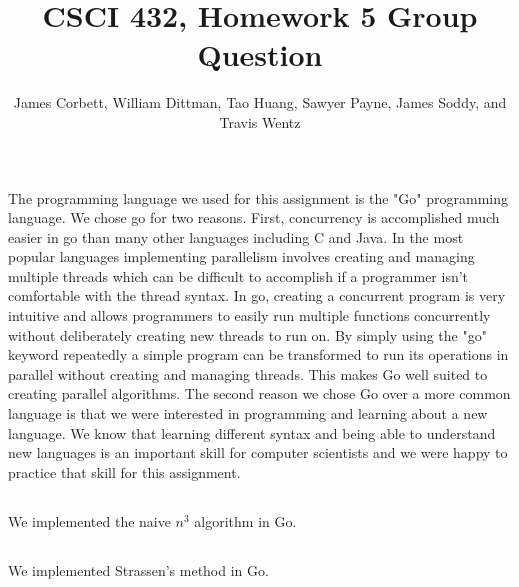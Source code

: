 \documentclass[11pt,twocolumn]{article}
\title{CSCI 432, Homework 5 Group Question}
\author{\small{ James Corbett, William Dittman, Tao Huang, Sawyer Payne, 
				James Soddy, and Travis Wentz}}
\begin{document}
\maketitle

\section{}

\subsection{} The programming language we used for this assignment is the "Go" programming 
language. We chose go for two reasons. First, concurrency is accomplished much easier in 
go than many other languages including C and Java. In the most popular languages 
implementing parallelism involves creating and managing multiple threads which can be 
difficult to accomplish if a programmer isn't comfortable with the thread syntax. In go, 
creating a concurrent program is very intuitive and allows programmers to easily run 
multiple functions concurrently without deliberately creating new threads to run on. By 
simply using the "go" keyword repeatedly a simple program can be transformed to run 
its operations in parallel without creating and managing threads. This makes Go well suited
to creating parallel algorithms. The second 
reason we chose Go over a more common language is that we were interested in programming 
and learning about a new language. We know that learning different syntax and being able 
to understand new languages is an important skill for computer scientists and we were 
happy to practice that skill for this assignment.

\subsection{} 
We implemented the naive $n^3$ algorithm in Go.

\subsection{}
 We implemented Strassen's method in Go.
\end{document}
